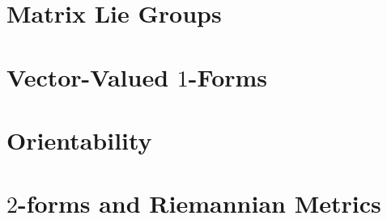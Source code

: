 \section{}

\section{Matrix Lie Groups}

\section{Vector-Valued $1$-Forms}

\section{Orientability}

\section{$2$-forms and Riemannian Metrics}
